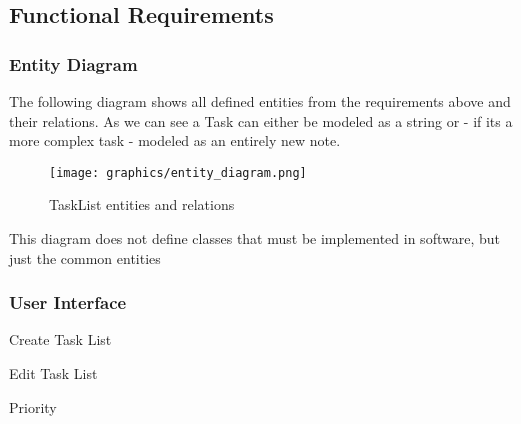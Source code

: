 \subsection{Functional Requirements}
\label{requirements:functional}
    \subsubsection{Entity Diagram}
    The following diagram shows all defined entities from the requirements above and their relations.
    As we can see a Task can either be modeled as a string or - if its a more complex task - modeled as an entirely new note.
    \begin{figure}[h]
	    \centering
        \texttt{[image: graphics/entity\_diagram.png]}
        \caption{TaskList entities and relations}
        \label{entities_relations}
    \end{figure}
    
    This diagram does not define classes that must be implemented in software, but just the common entities



    \subsubsection{User Interface} %
    \label{requirements:interfaces:user}

    \begin{requirement}{Create Task List}
    \end{requirement}

    \begin{requirement}{Edit Task List}
    \end{requirement}

    \begin{requirement}{Priority}
    \end{requirement}

